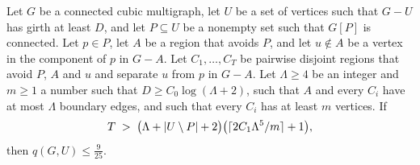 \begin{proposition}\label{prop:chain}
Let $G$ be a connected cubic multigraph, let $U$ be a set of vertices such that $G-U$ has girth at
least $D$, and let $P\subseteq U$ be a nonempty set such that $G[P]$ is connected. Let $p\in P$, let
$A$ be a region that avoids $P$, and let $u\notin A$ be a vertex in the component of $p$ in $G-A$.
Let $C_1,\dots,C_T$ be pairwise disjoint regions that avoid $P$, $A$ and $u$ and separate $u$ from
$p$ in $G-A$. Let $\Lambda\ge4$ be an integer and $m\ge1$ a number such that
$D\ge C_0\log(\Lambda+2)$, such that $A$ and every $C_i$ have at most $\Lambda$ boundary edges,
and such that every $C_i$ has at least $m$ vertices. If
\[
  T\;>\;\bigl(\Lambda+|U\setminus P|+2\bigr)\bigl(\lceil2C_1\Lambda^{5}/m\rceil+1\bigr),
\]
then $q(G,U)\le\frac9{25}$.
\end{proposition}

